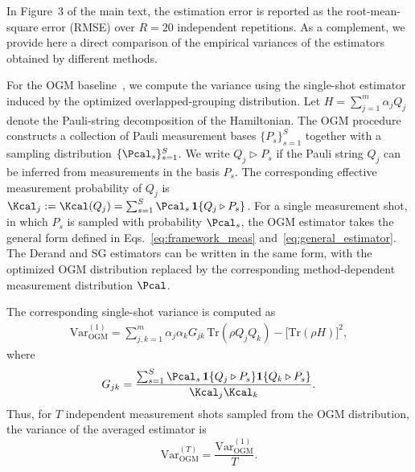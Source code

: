 \documentclass[prl,aps,notitlepage,superscriptaddress,showpacs,nofootinbib]{revtex4-2}
\newcommand{\red}[1]{{\color{red} #1}}
\begin{document}
\red{
In Figure~3 of the main text, the estimation error is reported as the root-mean-square error (RMSE) over $R=20$ independent repetitions. 
 As a complement, we provide here a direct comparison of the empirical variances of the estimators obtained by different methods. 


{
For the OGM baseline~\cite{wu2023overlapped}, we compute the variance using the single-shot estimator induced by the optimized overlapped-grouping distribution. 
Let $H=\sum_{j=1}^{m}\alpha_j Q_j$ denote the Pauli-string decomposition of the Hamiltonian. 
The OGM procedure constructs a collection of Pauli measurement bases $\{P_s\}_{s=1}^{S}$ together with a sampling distribution $\{\Pcal_s\}_{s=1}^{S}$. 
We write $Q_j\triangleright P_s$ if the Pauli string $Q_j$ can be inferred from measurements in the basis $P_s$. 
The corresponding effective measurement probability of $Q_j$ is $\Kcal_j:=\Kcal(Q_j)=\sum_{s=1}^{S}\Pcal_s\,\mathbf 1\{Q_j\triangleright P_s\}$. 
For a single measurement shot, in which $P_s$ is sampled with probability $\Pcal_s$, the OGM estimator takes the general form defined in Eqs.~\eqref{eq:framework_meas} and~\eqref{eq:general_estimator}. 
The Derand and SG estimators can be written in the same form, with the optimized OGM distribution replaced by the corresponding method-dependent measurement distribution $\Pcal$.

The corresponding single-shot variance is computed as
\begin{align}
    \mathrm{Var}_{\mathrm{OGM}}^{(1)}
    =
    \sum_{j,k=1}^{m}
    \alpha_j\alpha_k
    G_{jk}\,
    \mathrm{Tr}(\rho Q_jQ_k)
    -
    \bigl[\mathrm{Tr}(\rho H)\bigr]^2,
    \label{eq:variance_ogm_single}
\end{align}
where
\[
    G_{jk}
    =
    \frac{
    \sum_{s=1}^{S}
    \Pcal_s\,
    \mathbf 1\{Q_j\triangleright P_s\}
    \mathbf 1\{Q_k\triangleright P_s\}
    }{
    \Kcal_j\Kcal_k
    } .
\]
Thus, for $T$ independent measurement shots sampled from the OGM distribution, the variance of the averaged estimator is
\begin{equation}
    \mathrm{Var}_{\mathrm{OGM}}^{(T)}
    =
    \frac{\mathrm{Var}_{\mathrm{OGM}}^{(1)}}{T}.
    \label{eq:variance_OGM_T_rounds}
\end{equation}

}}
\end{document}
